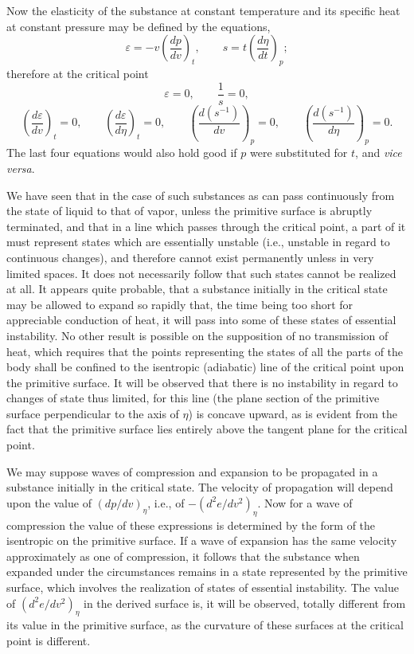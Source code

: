 \documentclass[11pt]{article}
\begin{document}
Now the elasticity of the substance at constant temperature and its specific heat at constant pressure may be defined by the equations,
\[
\varepsilon=-v\left(\frac{dp}{dv}\right)_t,
\qquad
s=t\left(\frac{d\eta}{dt}\right)_p;
\]
therefore at the critical point
\[
\varepsilon=0,
\qquad
\frac{1}{s}=0,
\]
\[
\left(\frac{d\varepsilon}{dv}\right)_t=0,
\qquad
\left(\frac{d\varepsilon}{d\eta}\right)_t=0,
\qquad
\left(\frac{d(s^{-1})}{dv}\right)_p=0,
\qquad
\left(\frac{d(s^{-1})}{d\eta}\right)_p=0.
\]
The last four equations would also hold good if $p$ were substituted for $t$, and \emph{vice versa}.

We have seen that in the case of such substances as can pass continuously from the state of liquid to that of vapor, unless the primitive surface is abruptly terminated, and that in a line which passes through the critical point, a part of it must represent states which are essentially unstable (i.e., unstable in regard to continuous changes), and therefore cannot exist permanently unless in very limited spaces. It does not necessarily follow that such states cannot be realized at all. It appears quite probable, that a substance initially in the critical state may be allowed to expand so rapidly that, the time being too short for appreciable conduction of heat, it will pass into some of these states of essential instability. No other result is possible on the supposition of no transmission of heat, which requires that the points representing the states of all the parts of the body shall be confined to the isentropic (adiabatic) line of the critical point upon the primitive surface. It will be observed that there is no instability in regard to changes of state thus limited, for this line (the plane section of the primitive surface perpendicular to the axis of $\eta$) is concave upward, as is evident from the fact that the primitive surface lies entirely above the tangent plane for the critical point.

We may suppose waves of compression and expansion to be propagated in a substance initially in the critical state. The velocity of propagation will depend upon the value of $\left(dp/dv\right)_\eta$, i.e., of $-\left(d^2e/dv^2\right)_\eta$. Now for a wave of compression the value of these expressions is determined by the form of the isentropic on the primitive surface. If a wave of expansion has the same velocity approximately as one of compression, it follows that the substance when expanded under the circumstances remains in a state represented by the primitive surface, which involves the realization of states of essential instability. The value of $\left(d^2e/dv^2\right)_\eta$ in the derived surface is, it will be observed, totally different from its value in the primitive surface, as the curvature of these surfaces at the critical point is different.
\end{document}
